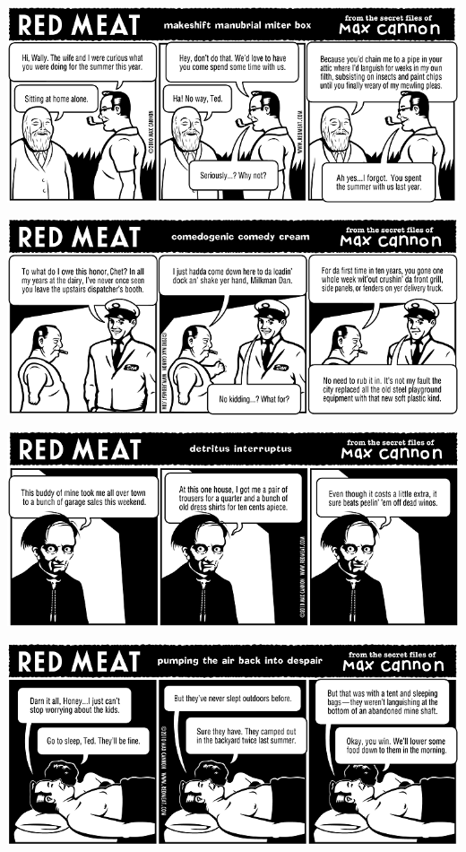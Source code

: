 \documentclass[a4paper,twoside,11pt]{article}
\begin{document}
\includegraphics[width=\textwidth]{redmeat_2010-07-27.png}



\includegraphics[width=\textwidth]{redmeat_2010-08-03.png}



\includegraphics[width=\textwidth]{redmeat_2010-08-10.png}



\includegraphics[width=\textwidth]{redmeat_2010-08-17.png}
\end{document}
